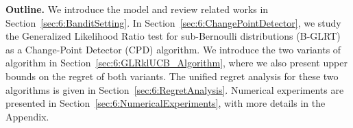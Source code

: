 



\textbf{Outline.}
%
We introduce the model and review related works in Section~\ref{sec:6:BanditSetting}. In Section~\ref{sec:6:ChangePointDetector}, we study the Generalized Likelihood Ratio test for sub-Bernoulli distributions (B-GLRT) as a Change-Point Detector (CPD) algorithm.
We introduce the two variants of \GLRklUCB{} algorithm in Section~\ref{sec:6:GLRklUCB_Algorithm}, where we also present upper bounds on the regret of both variants.
The unified regret analysis for these two algorithms is given in Section~\ref{sec:6:RegretAnalysis}.
Numerical experiments are presented in Section~\ref{sec:6:NumericalExperiments}, with more details in the Appendix.


